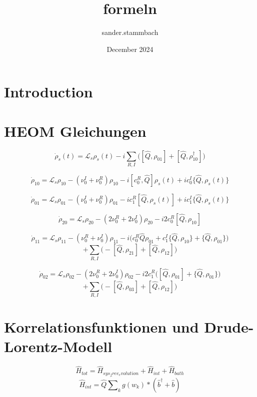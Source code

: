 \documentclass{article}
\title{formeln}
\author{sander.stammbach }
\date{December 2024}
\begin{document}
\pagecolor{black}   %
\color{white} 
\maketitle

\section{Introduction}


\section*{HEOM Gleichungen}

\[
\dot{\rho}_s(t) = \mathcal{L}_s \rho_s(t) - i \sum_{R,I} \Big([\hat{Q}, \rho_{01}] + [\hat{Q}, \rho_{10}^\dagger] \Big)
\]

\[
\dot{\rho}_{10} = \mathcal{L}_s \rho_{10} - (\nu_0^I + \nu_0^R) \rho_{10} - i [c_0^R, \hat{Q}] \rho_s(t) + i c_0^I \{ \hat{Q},\rho_s(t)\}
\]

\[
\dot{\rho}_{01} = \mathcal{L}_s \rho_{01} - (\nu_0^I + \nu_0^R) \rho_{01} - i c_1^R [\hat{Q},\rho_s(t)] + i c_1^I \{ \hat{Q},\rho_s(t)\}
\]

\[
\dot{\rho}_{20} = \mathcal{L}_s \rho_{20} - (2 \nu_0^R + 2 \nu_0^I) \rho_{20} - i 2 c_0^R [\hat{Q}, \rho_{10}]
\]

\[
\dot{\rho}_{11} = \mathcal{L}_s \rho_{11} - (\nu_0^R + \nu_0^I) \rho_{11} - i \Big(c_0^R \hat{Q} \rho_{01} + c_1^I \{ \hat{Q}, \rho_{10} \} + \{ \hat{Q}, \rho_{01} \}\Big)
\]
\[
+ \sum_{R,I} \Big( - [\hat{Q}, \rho_{21}] + [\hat{Q}, \rho_{12}] \Big)
\]

\[
\dot{\rho}_{02} = \mathcal{L}_s \rho_{02} - (2 \nu_0^R + 2 \nu_0^I) \rho_{02} - i 2 c_1^R \Big([\hat{Q}, \rho_{01}] + \{\hat{Q}, \rho_{01}\} \Big)
\]
\[
+ \sum_{R,I} \Big( - [\hat{Q}, \rho_{03}] + [\hat{Q}, \rho_{12}] \Big)
\]


\section*{Korrelationsfunktionen und Drude-Lorentz-Modell}
\begin{equation}
    \hat{H}_{tot}=\hat{H}_{sys_free_evolution}+\hat{H}_{int}+\hat{H}_{bath}
\end{equation}
\begin{equation}
    \hat{H}_{int}=\hat{Q}\dot \sum_k g(w_k)* (\hat{b}^{\dagger}+\hat{b})
\end{equation}
\end{document}
